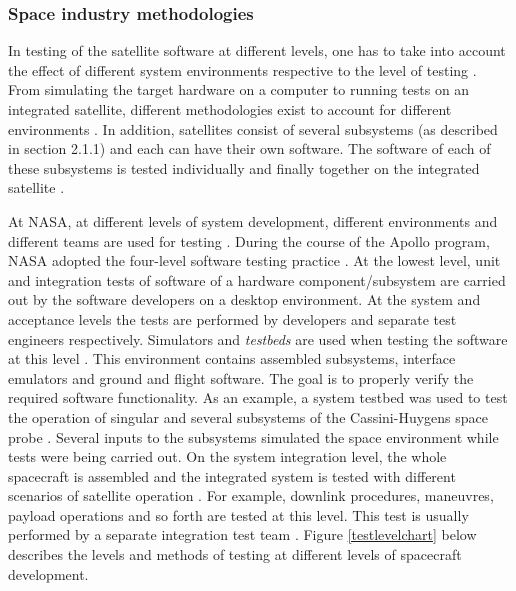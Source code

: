 \documentclass[english,12pt,a4paper,pdftex,elec,utf8]{aaltothesis}
\begin{document}
\subsubsection{Space industry methodologies}
In testing of the satellite software at different levels, one has to take into account the effect of different system environments respective to the level of testing \cite{embeddedsofteng, softacceptancespace}. From simulating the target hardware on a computer to running tests on an integrated satellite, different methodologies exist to account for different environments \cite{softacceptancespace}. In addition, satellites consist of several subsystems (as described in section 2.1.1) and each can have their own software. The software of each of these subsystems is tested individually and finally together on the integrated satellite \cite{sularikurssi, softacceptancespace}.\par
At NASA, at different levels of system development, different environments and different teams are used for testing \cite{softacceptancespace}. During the course of the Apollo program, NASA adopted the four-level software testing practice \cite{compinspace}. At the lowest level, unit and integration tests of software of a hardware component/subsystem are carried out by the software developers on a desktop environment. At the system and acceptance levels the tests are performed by developers and separate test engineers respectively. Simulators and \textit{testbeds} are used when testing the software at this level \cite{softacceptancespace, cassinitestbed}. This environment contains assembled subsystems, interface emulators and ground and flight software. The goal is to properly verify the required software functionality. As an example, a system testbed was used to test the operation of singular and several subsystems of the Cassini-Huygens space probe \cite{cassinitestbed}. Several inputs to the subsystems simulated the space environment while tests were being carried out. On the system integration level, the whole spacecraft is assembled and the integrated system is tested with different scenarios of satellite operation \cite{softacceptancespace, tor}. For example, downlink procedures, maneuvres, payload operations and so forth are tested at this level. This test is usually performed by a separate  integration test team \cite{softacceptancespace}. Figure \ref{testlevelchart} below describes the levels and methods of testing at different levels of spacecraft development. \par
\end{document}
